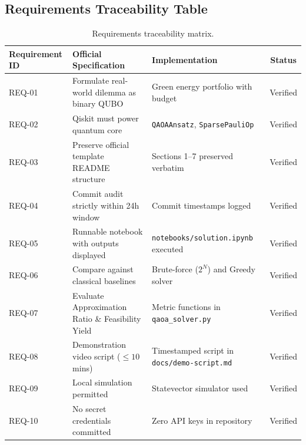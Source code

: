\subsection{Requirements Traceability Table}
\begin{table}[h]
\centering
\small
\begin{tabular}{lp{5.5cm}p{4cm}c}
\toprule
\textbf{Requirement ID} & \textbf{Official Specification} & \textbf{Implementation} & \textbf{Status} \\
\midrule
REQ-01 & Formulate real-world dilemma as binary QUBO & Green energy portfolio with budget & Verified \\
REQ-02 & Qiskit must power quantum core & \texttt{QAOAAnsatz}, \texttt{SparsePauliOp} & Verified \\
REQ-03 & Preserve official template README structure & Sections 1--7 preserved verbatim & Verified \\
REQ-04 & Commit audit strictly within 24h window & Commit timestamps logged & Verified \\
REQ-05 & Runnable notebook with outputs displayed & \texttt{notebooks/solution.ipynb} executed & Verified \\
REQ-06 & Compare against classical baselines & Brute-force ($2^N$) and Greedy solver & Verified \\
REQ-07 & Evaluate Approximation Ratio \& Feasibility Yield & Metric functions in \texttt{qaoa\_solver.py} & Verified \\
REQ-08 & Demonstration video script ($\le 10$ mins) & Timestamped script in \texttt{docs/demo-script.md} & Verified \\
REQ-09 & Local simulation permitted & Statevector simulator used & Verified \\
REQ-10 & No secret credentials committed & Zero API keys in repository & Verified \\
\bottomrule
\end{tabular}
\caption{Requirements traceability matrix.}
\end{table}
